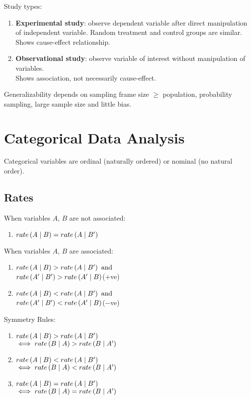 \documentclass[12pt, a4paper]{article}
\begin{document}
\begin{multicols*}{3}
Study types:
\begin{enumerate}[\roman*.]
  \item \textbf{Experimental study}: observe dependent variable after direct manipulation of independent variable. Random treatment and control groups are similar. \\Shows cause-effect relationship.
  \item \textbf{Observational study}: observe variable of interest without manipulation of variables. \\Shows association, not necessarily cause-effect. 
\end{enumerate}

Generalizability depends on sampling frame size $\geq$ population, probability sampling, large sample size and little bias.
\colbreak
\section{Categorical Data Analysis}
Categorical variables are ordinal (naturally ordered) or nominal (no natural order).

\subsection{Rates}

When variables $A$, $B$ are not associated:
\begin{enumerate}[\roman*.]
  \item $\mathord{rate} \left( A\mid B \right) = \mathord{rate} \left( A\mid B' \right)$
\end{enumerate}

When variables $A$, $B$ are associated:
\begin{enumerate}[\roman*.]
  \item $\mathord{rate} \left( A\mid B \right) > \mathord{rate} \left( A\mid B' \right)\text{ and}$\\$\mathord{rate} \left( A'\mid B' \right) > \mathord{rate} \left( A'\mid B \right)$\hfill($+$ve)
  \item $\mathord{rate} \left( A\mid B \right) < \mathord{rate} \left( A\mid B' \right)\text{ and}$\\$\mathord{rate} \left( A'\mid B' \right) < \mathord{rate} \left( A'\mid B \right)$\hfill($-$ve)
\end{enumerate}

Symmetry Rules:
\begin{enumerate}[\roman*.]
  \item $\mathord{rate} \left( A\mid B \right) > \mathord{rate} \left( A\mid B' \right)$ \\$\iff \mathord{rate} \left( B\mid A \right) > \mathord{rate} \left( B\mid A' \right)$
  \item $\mathord{rate} \left( A\mid B \right) < \mathord{rate} \left( A\mid B' \right)$ \\$\iff \mathord{rate} \left( B\mid A \right) < \mathord{rate} \left( B\mid A' \right)$
  \item $\mathord{rate} \left( A\mid B \right) = \mathord{rate} \left( A\mid B' \right)$ \\$\iff \mathord{rate} \left( B\mid A \right) = \mathord{rate} \left( B\mid A' \right)$
\end{enumerate}


\end{multicols*}
\end{document}
